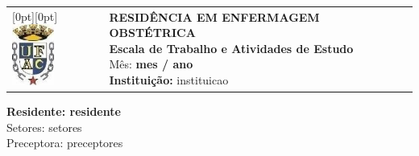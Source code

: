 \begin{flushleft}
    \begin{tabular}{@{}l l@{}}
        \raisebox{0pt}[0pt][0pt]{\includegraphics[height=2cm]{escala/recursos/ufac-logo.jpeg}} &
        \parbox[b][2cm][t]{0.82\linewidth}{
            \raggedright
            {\fontsize{11pt}{13pt}\selectfont
                \textbf{RESIDÊNCIA EM ENFERMAGEM OBSTÉTRICA} \\
                \textbf{Escala de Trabalho e Atividades de Estudo} \\
                Mês:\textbf{ {{ mes }} / {{ ano }} }\\
                \textbf{Instituição:} {{ instituicao }}
            }
        }
    \end{tabular}

    {\fontsize{12pt}{14pt}\selectfont
        \textbf{Residente: {{ residente }}} \\
        Setores: {{ setores }}\\
        Preceptora: {{ preceptores }}
    }
\end{flushleft}